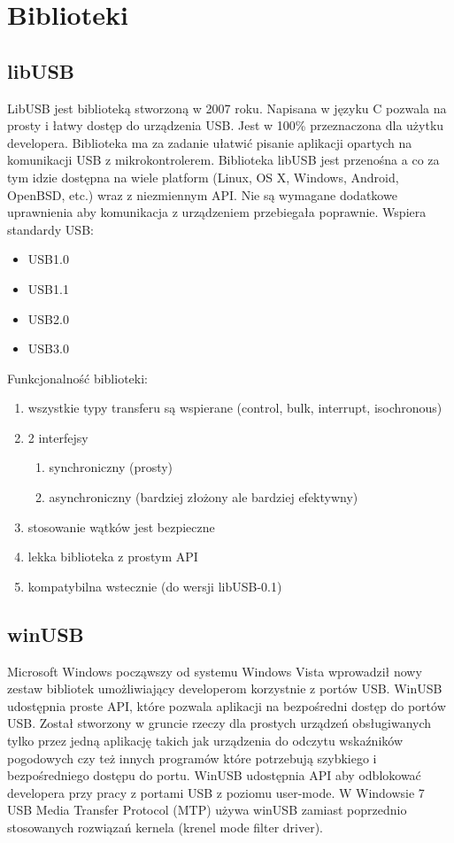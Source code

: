 \documentclass{BscUS}
\begin{document}
\chapter{Biblioteki}
\label{librariesChapter}
\section{libUSB}
LibUSB jest biblioteką stworzoną w 2007 roku. Napisana w języku C  pozwala na prosty i łatwy dostęp do urządzenia USB. Jest w 100\% przeznaczona dla użytku developera. Biblioteka ma za zadanie ułatwić pisanie aplikacji opartych na komunikacji USB z mikrokontrolerem.
Biblioteka libUSB jest przenośna a co za tym idzie dostępna na wiele platform (Linux, OS X, Windows, Android, OpenBSD, etc.) wraz z niezmiennym API.
Nie są wymagane dodatkowe uprawnienia aby komunikacja z urządzeniem przebiegała poprawnie.
Wspiera standardy USB: 
\begin{itemize}
\item USB1.0 
\item USB1.1 
\item USB2.0 
\item USB3.0
\end{itemize}

Funkcjonalność biblioteki:
\begin{enumerate}

\item wszystkie typy transferu są wspierane (control, bulk, interrupt, isochronous)
\item 2 interfejsy
\begin{enumerate}
\item synchroniczny (prosty)
\item asynchroniczny (bardziej złożony ale bardziej efektywny)
\end{enumerate}
\item stosowanie wątków jest bezpieczne
\item lekka biblioteka z prostym API
\item kompatybilna wstecznie (do wersji libUSB-0.1)
\end{enumerate}

\section{winUSB}

Microsoft Windows począwszy od systemu Windows Vista wprowadził nowy zestaw bibliotek umożliwiający developerom korzystnie z portów USB. WinUSB udostępnia proste API, które pozwala aplikacji na bezpośredni dostęp do portów USB. Został stworzony w gruncie rzeczy dla prostych urządzeń obsługiwanych tylko przez jedną aplikację takich jak urządzenia do odczytu wskaźników pogodowych czy też innych programów które potrzebują szybkiego i bezpośredniego dostępu do portu. WinUSB udostępnia API aby odblokować developera przy pracy z portami USB z poziomu user-mode. W Windowsie 7 USB Media Transfer Protocol (MTP) używa winUSB zamiast poprzednio stosowanych rozwiązań kernela (krenel mode filter driver).
\end{document}
